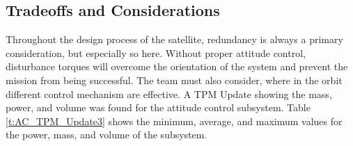 \documentclass[conf]{new-aiaa}
\begin{document}





\subsection{Tradeoffs and Considerations}
Throughout the design process of the satellite, redundancy is always a primary consideration, but especially so here. Without proper attitude control, disturbance torques will overcome the orientation of the system and prevent the mission from being successful. The team must also consider, where in the orbit different control mechanism are effective. A TPM Update showing the mass, power, and volume was found for the attitude control subsystem. Table \ref{t:AC_TPM_Update3} shows the minimum, average, and maximum values for the power, mass, and volume of the subsystem. 
\end{document}
